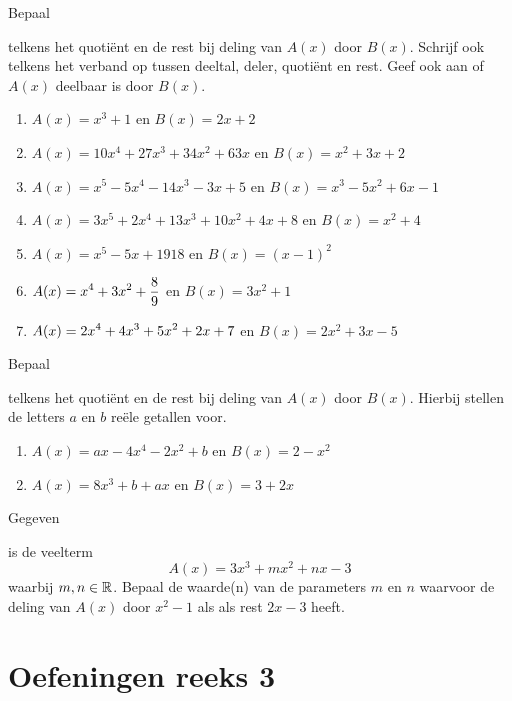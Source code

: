 \documentclass{ximera}
\begin{document}
\begin{Oefening}\setcounter{enumi}{11} 
\hypertarget{oef2.11}{Bepaal} telkens het quoti\"ent en de rest bij deling van $A(x)$ door $B(x)$. Schrijf ook telkens het verband op tussen deeltal, deler, quoti\"ent en rest. Geef ook aan of $A(x)$ deelbaar is door $B(x)$.
\begin{enumerate}
\item 
$A(x) = x^3+1$ \quad en \quad $B(x) = 2x+2$
\item
$A(x) = 10x^4 + 27x^3 + 34x^2 + 63x$ \quad en \quad $B(x) = x^2 + 3x + 2$ 
\item
$A(x) = x^5 - 5x^4 - 14x^3 - 3x + 5$ \quad en \quad $B(x) = x^3 - 5x^2 + 6x - 1$ 
\item
$A(x) = 3x^5 + 2x^4 + 13x^3 + 10x^2 + 4x + 8$ \quad en \quad $B(x) = x^2 + 4$ 
\item
$A(x) = x^5 - 5x + 1918$ \quad en \quad $B(x) = (x-1)^2$ 
\item
$\displaystyle A(x) = x^4 + 3x^2 + \frac{8}{9}$ en $B(x) = 3x^2 + 1$ 
\item
$\displaystyle A(x) = 2x^4 + 4x^3 + 5x^2 + 2x + 7$ en $B(x) = 2x^2+3x-5$ 
\end{enumerate}
\end{Oefening}

\begin{Oefening}\setcounter{enumi}{12} 
\hypertarget{oef2.12}{Bepaal} telkens het quoti\"ent en de rest bij deling van $A(x)$ door $B(x)$. Hierbij stellen de letters $a$ en $b$ re\"ele getallen voor. 
\begin{enumerate}
\item
$A(x) = ax - 4x^4 - 2x^2 + b$ en $B(x) = 2-x^2$ 
\item
$A(x) = 8x^3 + b + ax$ \quad en \quad $B(x) = 3+2x$ 
\end{enumerate}
\end{Oefening}

\begin{Oefening}\setcounter{enumi}{13} 
\hypertarget{oef2.13}{Gegeven} is de veelterm
\[
A(x) = 3x^3 + mx^2 + nx - 3
\]
waarbij $m,n \in \mathbb{R}$. Bepaal de waarde(n) van de parameters $m$ en $n$ waarvoor de deling van $A(x)$ door $x^2-1$ als als rest $2x-3$ heeft. 
\end{Oefening}

\section*{Oefeningen reeks 3}
\end{document}
